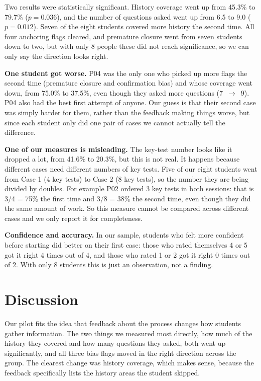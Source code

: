 \documentclass[conference]{IEEEtran}
\begin{document}
Two results were statistically significant. History coverage went up from 45.3\%
to 79.7\% ($p=0.036$), and the number of questions asked went up from 6.5 to 9.0
($p=0.012$). Seven of the eight students covered more history the second time.
All four anchoring flags cleared, and premature closure went from seven students
down to two, but with only 8 people these did not reach significance, so we can
only say the direction looks right.

\textbf{One student got worse.} P04 was the only one who picked up more flags the
second time (premature closure and confirmation bias) and whose coverage went
down, from 75.0\% to 37.5\%, even though they asked more questions
(7~$\rightarrow$~9). P04 also had the best first attempt of anyone. Our guess is
that their second case was simply harder for them, rather than the feedback
making things worse, but since each student only did one pair of cases we cannot
actually tell the difference.

\textbf{One of our measures is misleading.} The key-test number looks like it
dropped a lot, from 41.6\% to 20.3\%, but this is not real. It happens because
different cases need different numbers of key tests. Five of our eight students
went from Case 1 (4 key tests) to Case 2 (8 key tests), so the number they are
being divided by doubles. For example P02 ordered 3 key tests in both sessions:
that is 3/4 = 75\% the first time and 3/8 = 38\% the second time, even though
they did the same amount of work. So this measure cannot be compared across
different cases and we only report it for completeness.

\textbf{Confidence and accuracy.} In our sample, students who felt more confident
before starting did better on their first case: those who rated themselves 4 or 5
got it right 4 times out of 4, and those who rated 1 or 2 got it right 0 times
out of 2. With only 8 students this is just an observation, not a finding.

\section{Discussion}
Our pilot fits the idea that feedback about the process changes how students
gather information. The two things we measured most directly, how much of the
history they covered and how many questions they asked, both went up
significantly, and all three bias flags moved in the right direction across the
group. The clearest change was history coverage, which makes sense, because the
feedback specifically lists the history areas the student skipped.
\end{document}
